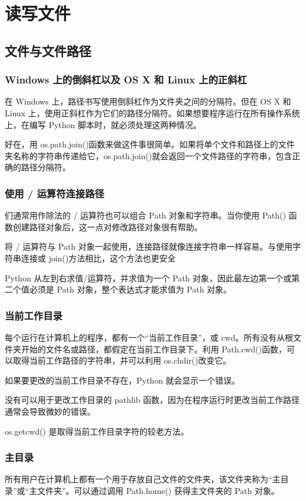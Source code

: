 \chapter{读写文件\label{ch09}}
\section{文件与文件路径}
\subsection{Windows 上的倒斜杠以及 OS X 和 Linux 上的正斜杠}
在 Windows 上，路径书写使用倒斜杠作为文件夹之间的分隔符。但在 OS X 和 Linux 上，使用正斜杠作为它们的路径分隔符。如果想要程序运行在所有操作系统上，在编写 Python 脚本时，就必须处理这两种情况。

好在，用 os.path.join()函数来做这件事很简单。如果将单个文件和路径上的文件夹名称的字符串传递给它，os.path.join()就会返回一个文件路径的字符串，包含正确的路径分隔符。
\subsection{使用 / 运算符连接路径}
们通常用作除法的 / 运算符也可以组合 Path 对象和字符串。当你使用 Path() 函数创建路径对象后，这一点对修改路径对象很有帮助。

将 / 运算符与 Path 对象一起使用，连接路径就像连接字符串一样容易。与使用字符串连接或 join()方法相比，这个方法也更安全

Python 从左到右求值/运算符，并求值为一个 Path 对象，因此最左边第一个或第二个值必须是 Path 对象，整个表达式才能求值为 Path 对象。
\subsection{当前工作目录}
每个运行在计算机上的程序，都有一个“当前工作目录”，或 cwd。所有没有从根文件夹开始的文件名或路径，都假定在当前工作目录下。利用 Path.cwd()函数，可以取得当前工作路径的字符串，并可以利用 os.chdir()改变它。

如果要更改的当前工作目录不存在，Python 就会显示一个错误。

没有可以用于更改工作目录的 pathlib 函数，因为在程序运行时更改当前工作路径通常会导致微妙的错误。

os.getcwd() 是取得当前工作目录字符的较老方法。
\subsection{主目录}
所有用户在计算机上都有一个用于存放自己文件的文件夹，该文件夹称为“主目录”或“主文件夹”。可以通过调用 Path.home() 获得主文件夹的 Path 对象。
